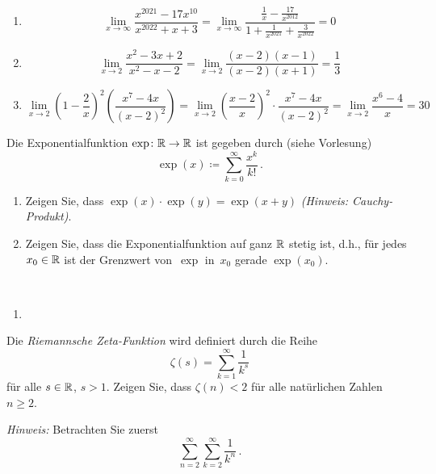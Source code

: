 \bigskip

\begin{lsg}
\begin{enumerate}[label=$\mathrm{(\roman*)}$, ref=$\mathrm{\roman*}$]
\setlength{\itemsep}{4pt}
\item\[\lim_{x \to\infty}\frac{x^{2021}-17x^{10}}{x^{2022}+x+3} =\lim_{x \to\infty} \frac{\frac{1}{x}-\frac{17}{x^{2012}}}{1+\frac{1}{x^{2021}}+\frac{3}{x^{2022}}}=0 \]		
\item\[\lim_{x \to 2}\frac{x^{2}-3x+2}{x^{2}-x-2}= \lim_{x \to 2} \frac{(x-2)(x-1)}{(x-2)(x+1)}=\frac{1}{3}\]
\item\[ \lim_{x \to 2}\left(1-\frac{2}{x}\right)^2\left(\frac{x^7-4x}{\left(x-2\right)^2}\right)=\lim_{x \to 2}\left(\frac{x-2}{x}\right)^2    \cdot \frac{x^7-4x}{(x-2)^2}=\lim_{x \to 2} \frac{x^6-4}{x}= 30\] 
\end{enumerate}
\end{lsg}

\bigskip

\begin{aufg}[6 Punkte]
Die Exponentialfunktion $\exp\colon\mathbb{R}\to\mathbb{R}$ ist gegeben durch (siehe Vorlesung)
\[
\exp(x)\coloneqq \sum_{k=0}^{\infty}\frac{x^k}{k!}\,. 
\]
\begin{enumerate}[label=$\mathrm{(\roman*)}$, ref=$\mathrm{\roman*}$]
\item Zeigen Sie, dass $\exp(x)\cdot \exp(y)=\exp(x+y)$ \emph{(Hinweis: Cauchy-Produkt)}.
\item Zeigen Sie, dass die Exponentialfunktion auf ganz $\mathbb{R}$ stetig ist, d.h., f\"ur jedes~$x_0\in\mathbb{R}$ ist der Grenzwert von~$\exp$ in~$x_0$ gerade $\exp(x_0)$.
\end{enumerate}
\end{aufg}
 
\bigskip

\begin{lsg}\mbox{ }
\begin{enumerate}[label=$\mathrm{(\roman*)}$, ref=$\mathrm{\roman*}$]
\item 
\end{enumerate}
\end{lsg}

\bigskip


\begin{aufg}[6 Punkte]
Die \textit{Riemannsche Zeta-Funktion} wird definiert durch die Reihe 
\[
\zeta(s) = \sum_{k=1}^{\infty} \frac{1}{k^{s}}
\]
f\"ur alle $s\in \mathbb{R}$, $s>1$. Zeigen Sie, dass $\zeta(n) < 2$ f\"ur alle nat\"urlichen Zahlen $n\geq 2$. 

\noindent
\emph{Hinweis:} Betrachten Sie zuerst
\[
\sum_{n=2}^{\infty} \sum_{k=2}^{\infty} \frac{1}{k^{n}}\,.
\]
\end{aufg}


